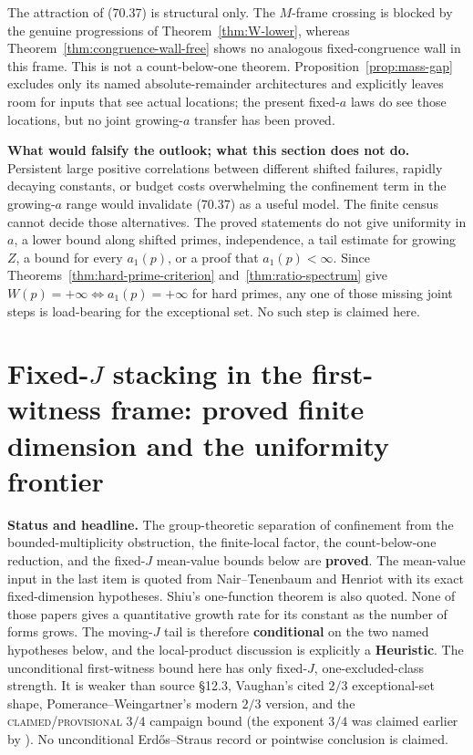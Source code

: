 \documentclass[10pt,reqno]{amsart}
\theoremstyle{definition}
\newcommand{\1}{\mathbf 1}
\begin{document}
The attraction of (70.37) is structural only.  The $M$-frame crossing is
blocked by the genuine progressions of Theorem~\ref{thm:W-lower}, whereas Theorem~\ref{thm:congruence-wall-free}
shows no analogous fixed-congruence wall in this frame.  This is not a
count-below-one theorem.  Proposition~\ref{prop:mass-gap} excludes only its named
absolute-remainder architectures and explicitly leaves room for inputs that
see actual locations; the present fixed-$a$ laws do see those locations,
but no joint growing-$a$ transfer has been proved.

\textbf{What would falsify the outlook; what this section does not do.}  Persistent
large positive correlations between different shifted failures, rapidly
decaying constants, or budget costs overwhelming the confinement term in
the growing-$a$ range would invalidate (70.37) as a useful model.  The
finite census cannot decide those alternatives.  The proved statements do
not give uniformity in $a$, a lower bound along shifted primes, independence,
a tail estimate for growing $Z$, a bound for every $a_1(p)$, or a proof
that $a_1(p)<\infty$.  Since Theorems~\ref{thm:hard-prime-criterion} and~\ref{thm:ratio-spectrum} give
$W(p)=+\infty\Longleftrightarrow a_1(p)=+\infty$ for hard primes, any one
of those missing joint steps is load-bearing for the exceptional set.  No
such step is claimed here.

\section{Fixed-$J$ stacking in the first-witness frame: proved finite dimension and the uniformity frontier}
\label{sec:fixed-J-stacking}

\medskip\noindent\textbf{Status and headline.}
The group-theoretic separation of confinement from the
bounded-multiplicity obstruction, the finite-local factor, the count-below-one
reduction, and the fixed-$J$ mean-value bounds below are \textbf{proved}.  The
mean-value input in the last item is quoted from Nair--Tenenbaum and Henriot
with its exact fixed-dimension hypotheses.  Shiu's one-function theorem is
also quoted.  None of those papers gives a quantitative growth rate for its
constant as the number of forms grows.  The moving-$J$ tail is therefore
\textbf{conditional} on the two named hypotheses below, and the local-product
discussion is explicitly a \textbf{Heuristic}.  The unconditional first-witness
bound here has only fixed-$J$, one-excluded-class strength.  It is weaker than
source \S12.3, Vaughan's cited $2/3$ exceptional-set shape, Pomerance--Weingartner's
modern $2/3$ version, and the \textsc{claimed/provisional} $3/4$ campaign bound
(the exponent $3/4$ was claimed earlier by \cite{KRK}).
No unconditional Erd\H{o}s--Straus record or pointwise conclusion is claimed.
\end{document}
